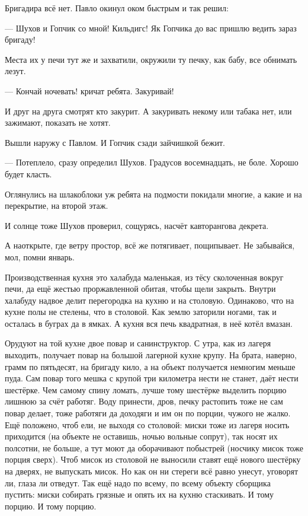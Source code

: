 Бригадира всё нет. Павло окинул оком быстрым и так решил:

--- Шухов и Гопчик \dash со мной! Кильдигс! Як Гопчика до вас пришлю \dash ведить зараз бригаду!

Места их у печи тут же и захватили, окружили ту печку, как бабу, все обнимать лезут.

--- Кончай ночевать! \dash кричат ребята. \Dash Закуривай!

И друг на друга смотрят \dash кто закурит. А закуривать некому \dash или табака нет, или зажимают,
показать не хотят.

Вышли наружу с Павлом. И Гопчик сзади зайчишкой бежит.

--- Потеплело, \dash сразу определил Шухов. \Dash Градусов восемнадцать, не боле. Хорошо будет класть.

Оглянулись на шлакоблоки \dash уж ребята на подмости покидали многие, а какие и на перекрытие,
на второй этаж.

И солнце тоже Шухов проверил, сощурясь, \dash насчёт кавторангова декрета.

А наоткрыте, где ветру простор, всё же потягивает, пощипывает. Не забывайся, мол, помни январь.

Производственная кухня \dash это халабуда маленькая, из тёсу сколоченная вокруг печи, да ещё
жестью проржавленной обитая, чтобы щели закрыть. Внутри халабуду надвое делит перегородка
\dash на кухню и на столовую. Одинаково, что на кухне полы не стелены, что в столовой. Как землю
заторили ногами, так и осталась в буграх да в ямках. А кухня вся \dash печь квадратная, в неё
котёл вмазан.

Орудуют на той кухне двое \dash повар и санинструктор. С утра, как из лагеря выходить, получает
повар на большой лагерной кухне крупу. На брата, наверно, грамм по пятьдесят, на бригаду \dash
кило, а на объект получается немногим меньше пуда. Сам повар того мешка с крупой три
километра нести не станет, даёт нести шестёрке. Чем самому спину ломать, лучше тому шестёрке
выделить порцию лишнюю за счёт работяг. Воду принести, дров, печку растопить \dash тоже не сам
повар делает, тоже работяги да доходяги \dash и им он по порции, чужого не жалко. Ещё положено,
чтоб ели, не выходя со столовой: миски тоже из лагеря носить приходится (на объекте не
оставишь, ночью вольные сопрут), так носят их полсотни, не больше, а тут моют да оборачивают
побыстрей (носчику мисок \dash тоже порция сверх). Чтоб мисок из столовой не выносили \dash ставят
ещё нового шестёрку на дверях, не выпускать мисок. Но как он ни стереги \dash всё равно унесут,
уговорят ли, глаза ли отведут. Так ещё надо по всему, по всему объекту сборщика пустить: миски
собирать грязные и опять их на кухню стаскивать. И тому порцию. И тому порцию.

